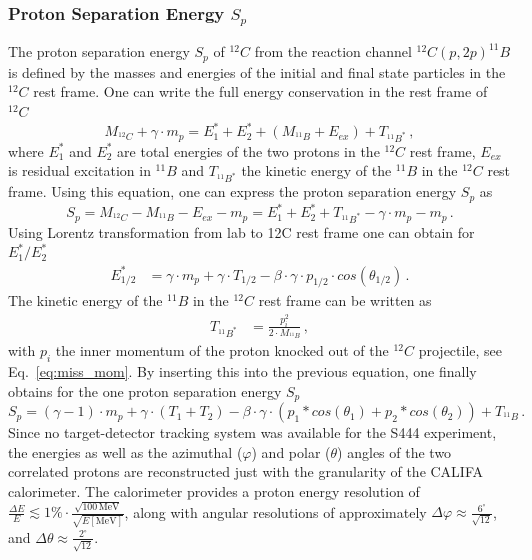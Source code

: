 \subsubsection{Proton Separation Energy $S_p$}
The proton separation energy $S_p$ of $^{12}C$ from the reaction channel $^{12}C(p,2p)^{11}B$ is defined by the masses and energies of the initial and final state particles in the $^{12}C$ rest frame. One can write the full energy conservation in the rest frame of $^{12}C$
\begin{equation}
M_{^{12}C} + \gamma \cdot m_p = E_1^* + E_2^* + (M_{^{11}B} + E_{ex})  + T_{^{11}B^*} \, ,
\end{equation}
where $E_1^*$ and $E_2^*$ are total energies of the two protons in the $^{12}C$ rest frame, $E_{ex}$ is residual excitation in $^{11}B$ and $T_{^{11}B^*}$ the kinetic energy of the $^{11}B$ in the $^{12}C$ rest frame.\newline
Using this equation, one can express the proton separation energy $S_p$ as
\begin{equation}
S_p = M_{^{12}C} - M_{^{11}B} - E_{ex} - m_p = E_1^* + E_2^* + T_{^{11}B^*} - \gamma \cdot m_p - m_p \, .
\end{equation}
Using Lorentz transformation from lab to 12C rest frame one can obtain for $E_1^*/E_2^*$
\begin{align*}
E_{1/2}^* &=  \gamma \cdot m_p + \gamma \cdot T_{1/2} - \beta \cdot \gamma \cdot p_{1/2} \cdot cos(\theta_{1/2}) \, .
\end{align*}
The kinetic energy of the $^{11}B$ in the $^{12}C$ rest frame can be written as
\begin{align*}
T_{^{11}B^*} &= \frac{p_i^2}{2 \cdot M_{^{11}B}} \, ,
\end{align*}
with $p_i$ the inner momentum of the proton knocked out of the $^{12}C$ projectile, see Eq.~\ref{eq:miss_mom}.
By inserting this into the  previous equation, one finally obtains for the one proton separation energy $S_p$
\begin{equation}\label{eq:sep_energy}
S_p = (\gamma - 1)\cdot m_p + \gamma \cdot (T_1+T_2) - \beta \cdot \gamma \cdot(p_1*cos(\theta_1) + p_2*cos(\theta_2)) + T_{^{11}B} \, .
\end{equation}
Since no target-detector tracking system was available for the S444 experiment, the energies as well as the azimuthal ($\varphi$) and polar ($\theta$) angles of the two correlated protons are reconstructed just with the granularity of the CALIFA calorimeter. The calorimeter provides a proton energy resolution of $\frac{\Delta E}{E} \lesssim 1 \%\cdot\frac{\sqrt{100\,\text{MeV}}}{\sqrt{E[\text{MeV}]}}$, along with angular resolutions of approximately  $\Delta \varphi \approx \frac{6^{\circ}}{\sqrt{12}}$, and $\Delta \theta \approx \frac{2^{\circ}}{\sqrt{12}}$.
